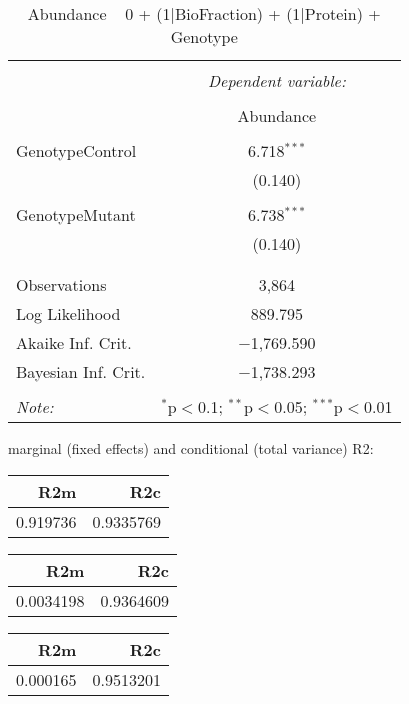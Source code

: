 \documentclass[11pt]{report}
\begin{document}
\begin{table}[!htbp] \centering 
  \caption{Abundance ~ 0 + (1|BioFraction) + (1|Protein) + Genotype} 
  \label{} 
\begin{tabular}{@{\extracolsep{5pt}}lc} 
\\[-1.8ex]\hline 
\hline \\[-1.8ex] 
 & \multicolumn{1}{c}{\textit{Dependent variable:}} \\ 
\cline{2-2} 
\\[-1.8ex] & Abundance \\ 
\hline \\[-1.8ex] 
 GenotypeControl & 6.718$^{***}$ \\ 
  & (0.140) \\ 
  & \\ 
 GenotypeMutant & 6.738$^{***}$ \\ 
  & (0.140) \\ 
  & \\ 
\hline \\[-1.8ex] 
Observations & 3,864 \\ 
Log Likelihood & 889.795 \\ 
Akaike Inf. Crit. & $-$1,769.590 \\ 
Bayesian Inf. Crit. & $-$1,738.293 \\ 
\hline 
\hline \\[-1.8ex] 
\textit{Note:}  & \multicolumn{1}{r}{$^{*}$p$<$0.1; $^{**}$p$<$0.05; $^{***}$p$<$0.01} \\ 
\end{tabular} 
\end{table} 
marginal (fixed effects) and conditional (total variance) R2:

\begin{tabular}{r|r}
\hline
R2m & R2c\\
\hline
0.919736 & 0.9335769\\
\hline
\end{tabular}

\begin{tabular}{r|r}
\hline
R2m & R2c\\
\hline
0.0034198 & 0.9364609\\
\hline
\end{tabular}

\begin{tabular}{r|r}
\hline
R2m & R2c\\
\hline
0.000165 & 0.9513201\\
\hline
\end{tabular}
\end{document}
